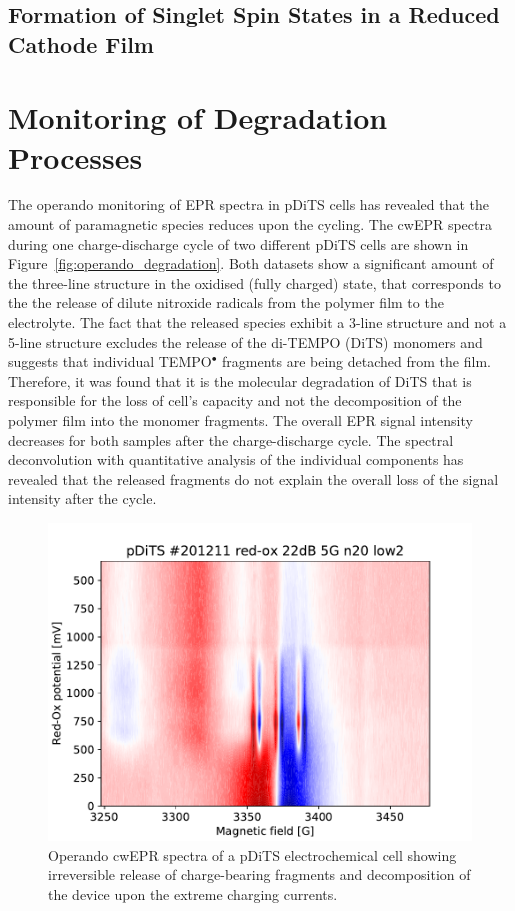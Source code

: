 \subsection{Formation of Singlet Spin States in a Reduced Cathode Film}

\section{Monitoring of Degradation Processes}
The operando monitoring of EPR spectra in pDiTS cells has revealed that the amount of paramagnetic species reduces upon the cycling. The cwEPR spectra during one charge-discharge cycle of two different pDiTS cells are shown in Figure~\ref{fig:operando_degradation}. Both datasets show a significant amount of the three-line structure in the oxidised (fully charged) state, that corresponds to the the release of dilute nitroxide radicals from the polymer film to the electrolyte. The fact that the released species exhibit a 3-line structure and not a 5-line structure excludes the release of the di-TEMPO (DiTS) monomers and suggests that individual TEMPO$^{\bullet}$ fragments are being detached from the film. Therefore, it was found that it is the molecular degradation of DiTS that is responsible for the loss of cell's capacity and not the decomposition of the polymer film into the monomer fragments. The overall EPR signal intensity decreases for both samples after the charge-discharge cycle. The spectral deconvolution with quantitative analysis of the individual components has revealed that the released fragments do not explain the overall loss of the signal intensity after the cycle.


\begin{figure}[!h]
\center
	\includegraphics[width=1\textwidth]{./operando_epr/figures/degradation/overnight_dits_201211_full_redox_contour_XY.pdf}
	\caption{Operando cwEPR spectra of a pDiTS electrochemical cell showing irreversible release of charge-bearing fragments and decomposition of the device upon the extreme charging currents.}
	\label{fig:operando_degradation_device}
\end{figure}


